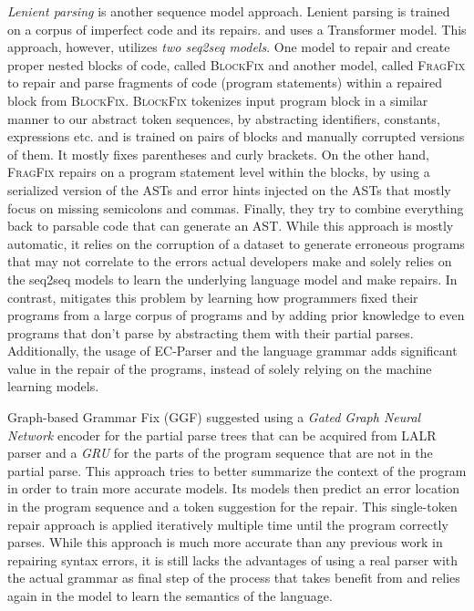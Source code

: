 \emph{Lenient parsing} \citep{Ahmed_2021} is another sequence model approach.
Lenient parsing is trained on a corpus of imperfect code and its repairs. and
uses a Transformer model. This approach, however, utilizes \emph{two seq2seq
models}. One model to repair and create proper nested blocks of code, called
\textsc{BlockFix} and another model, called \textsc{FragFix} to repair and parse
fragments of code (\eg program statements) within a repaired block from
\textsc{BlockFix}. \textsc{BlockFix} tokenizes input program block in a similar
manner to our abstract token sequences, by abstracting identifiers, constants,
expressions etc. and is trained on pairs of blocks and manually corrupted
versions of them. It mostly fixes parentheses and curly brackets. On the other
hand, \textsc{FragFix} repairs on a program statement level within the blocks,
by using a serialized version of the ASTs and error hints injected on the ASTs
that mostly focus on missing semicolons and commas. Finally, they try to combine
everything back to parsable code that can generate an AST. While this approach
is mostly automatic, it relies on the corruption of a dataset to generate
erroneous programs that may not correlate to the errors actual developers make
and solely relies on the seq2seq models to learn the underlying language model
and make repairs. In contrast, \toolname mitigates this problem by learning how
programmers fixed their programs from a large corpus of programs and by adding
prior knowledge to even programs that don't parse by abstracting them with their
partial parses. Additionally, the usage of EC-Parser and the language grammar
adds significant value in the repair of the programs, instead of solely relying
on the machine learning models.

%
Graph-based Grammar Fix (\textsc{GGF}) \citep{Wu2020} suggested using a
\emph{Gated Graph Neural Network} encoder for the partial parse trees that can
be acquired from LALR parser and a \emph{GRU} for the parts of the program
sequence that are not in the partial parse. This approach tries to better
summarize the context of the program in order to train more accurate models. Its
models then predict an error location in the program sequence and a token
suggestion for the repair. This single-token repair approach is applied
iteratively multiple time until the program correctly parses. While this
approach is much more accurate than any previous work in repairing syntax
errors, it is still lacks the advantages of using a real parser with the actual
grammar as final step of the process that \toolname takes benefit from and
relies again in the model to learn the semantics of the language.

